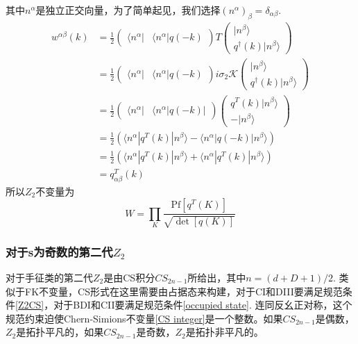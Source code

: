 \documentclass[a4paper]{article}
\numberwithin{equation}{subsection}
\begin{document}
其中$n^\alpha$是独立正交向量，为了简单起见，我们选择$(n^\alpha)_\beta=\delta_{\alpha\beta}$.
\begin{equation}
    \begin{split}
        w^{\alpha\beta}(k)&=\frac{1}{2}\begin{pmatrix}
            \langle n^\alpha|&\langle n^\alpha| q(-k)
        \end{pmatrix}T\begin{pmatrix}
            |n^\beta\rangle\\
            q^\dagger(k)|n^\beta\rangle
        \end{pmatrix}\\
        &=\frac{1}{2}\begin{pmatrix}
            \langle n^\alpha|&\langle n^\alpha| q(-k)
        \end{pmatrix}i\sigma_2\mathcal{K}\begin{pmatrix}
            |n^\beta\rangle\\
            q^\dagger(k)|n^\beta\rangle
        \end{pmatrix}\\
        &=\frac{1}{2}\begin{pmatrix}
            \langle n^\alpha|&\langle n^\alpha|q(-k)|
        \end{pmatrix}\begin{pmatrix}
            q^T(k)|n^\beta\rangle\\
            -|n^\beta\rangle
        \end{pmatrix}\\
        &=\frac{1}{2}(\langle n^\alpha|q^T(k)|n^\beta\rangle-\langle n^\alpha|q(-k)|n^\beta\rangle)\\
        &=\frac{1}{2}(\langle n^\alpha|q^T(k)|n^\beta\rangle+\langle n^\alpha|q^T(k)|n^\beta\rangle)\\
        &=q^T_{\alpha\beta}(k)
    \end{split}
\end{equation}
所以$Z_2$不变量为
\begin{equation}
    W=\prod_{K}\frac{\mathrm{Pf}[q^T(K)]}{\sqrt{\det [q(K)]}}
\end{equation}
\subsubsection{对于s为奇数的第二代$Z_2$}
对于手征类的第二代$Z_2$是由CS积分$CS_{2n-1}$所给出，其中$n=(d+D+1)/2$. 类似于FK不变量，CS形式在这里需要由占据态来构建，对于CI和DIII要满足规范条件\eqref{Z2CS}，对于BDI和CII要满足规范条件\eqref{occupied state}. 连同反幺正对称，这个规范约束迫使Chern-Simions不变量\eqref{CS integer}是一个整数。如果$CS_{2n-1}$是偶数，$Z_2$是拓扑平凡的，如果$CS_{2n-1}$是奇数，$Z_2$是拓扑非平凡的。
\end{document}
